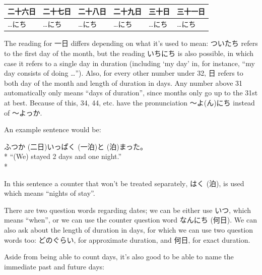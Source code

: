 \documentclass[11pt, b5paper, twoside, openright, onecolumn]{book}
\makeatletter
\newcommand*{\rubystack}[2]{{\relscale{0.5}%
  \begin{tabular}[b]{@{}c@{}}%
    {#1}\\%
   {\textscale{2}{#2}}%
  \end{tabular}}%
}
\DeclareRobustCommand*{\ruby}[2]{%
  \mbox{%
    \setlength{\parskip}{0ex}%
    \BeginAccSupp{method=pdfstringdef,ActualText={#1}}%
      \rubystack{\phantom{#2}}{#1}%
      \llap{%
        \rubystack{#2}{\phantom{#1}}%
      }%
    \EndAccSupp{}%
  }%
}
\renewcommand*{\ruby}[2]{#2 (#1)}%
\newenvironment{exampleblock}{
\setlength{\parindent}{0.6in}
\begin{minipage}[t]{\dimexpr\textwidth-\parindent}}
{\end{minipage}}
\newenvironment{mytabular}[1]{\noindent\hspace{0.4in}
\begin{tabular}[h]{#1}}{\end{tabular}}
\makeatother
\begin{document}
\smaller
\begin{mytabular}{| l  l  l  l  l  l |}\hline 
\rule{0pt}{2.4ex}二十六日 & 二十七日 & 二十八日 & 二十九日 & 三十日 & 三十一日\\ 
\hline
\rule{0pt}{2.4ex}…にち & …にち & …にち & …にち & …にち & …にち\\ 
\hline 
\end{mytabular}
\larger
\vspace{0.5cm}


The reading for 一日 differs depending on what it’s used to mean: ついたち refers to the first day of the month‚ but the reading いちにち is also possible‚ in which case it refers to a single day in duration (including ‘my day’ in‚ for instance‚ “my day consists of doing …”). Also‚ for every other number under 32‚ 日 refers to both day of the month and length of duration in days. Any number above 31 automatically only means “days of duration”‚ since months only go up to the 31st at best. Because of this‚ 34‚ 44‚ etc. have the pronunciation ～よ(ん)にち instead of ～よっか.

An example sentence would be:

\vspace{0.4cm}
\begin{exampleblock}
\ruby{二日}{ふつか}\ruby{一泊}{いっぱく}\ruby{泊}{と}まった。 \\* 
“(We) stayed 2 days and one night.” \\* 
\end{exampleblock}
\vspace{0.2cm}

In this sentence a counter that won’t be treated separately‚ \ruby{泊}{はく}‚ is used which means “nights of stay”.

There are two question words regarding dates; we can be either use いつ‚ which means “when”‚ or we can use the counter question word \ruby{何日}{なんにち}. We can also ask about the length of duration in days‚ for which we can use two question words too: どのぐらい‚ for approximate duration‚ and 何日‚ for exact duration.

Aside from being able to count days‚ it’s also good to be able to name the immediate past and future days:
\end{document}
